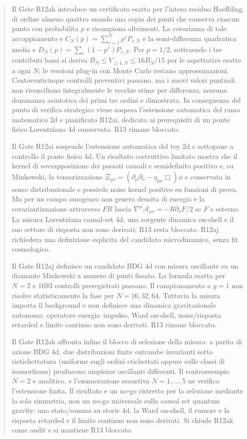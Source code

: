 \documentclass[11pt,a4paper]{article}
\begin{document}
\begin{abstract}
Il Gate R12ah introduce un certificato esatto per l'intero residuo Hoeffding di ordine almeno quattro usando una copia dei punti che conserva ciascun punto con probabilita $p$ e risampiona altrimenti. La covarianza di tale accoppiamento e $C_N(p)=\sum_{r=1}^{N} p^r P_{r,N}$ e la semi-differenza quadratica media e $D_N(p)=\sum_r(1-p^r)P_{r,N}$. Per $p=1/2$, sottraendo i tre contributi bassi si deriva $B_N\le V_{\ge4,N}\le16B_N/15$ per le aspettative esatte a ogni $N$; le versioni plug-in con Monte Carlo restano approssimazioni. Centoventicinque controlli preventivi passano, ma i nuovi valori puntuali non riconciliano integralmente le vecchie stime per differenza; nessuna dominanza asintotica dei primi tre ordini e dimostrata. In conseguenza del punto di verifica strategico viene sospesa l'estensione automatica del ramo matematico 2d e pianificato R12ai, dedicato ai prerequisiti di un ponte fisico Lorentziano 4d conservato. R13 rimane bloccato.


Il Gate R12ai sospende l'estensione automatica del toy 2d e sottopone a controllo il ponte fisico 4d. Un risultato costruttivo limitato mostra che il kernel di sovrapposizione dei passati causali e semidefinito positivo e, su Minkowski, la tensorizzazione $\Xi_{\mu\nu}=(\partial_\mu\partial_\nu-\eta_{\mu\nu}\Box)\phi$ e conservata in senso distribuzionale e possiede noise kernel positivo su funzioni di prova. Ma per un campo omogeneo non genera densita di energia e la covariantizzazione attraverso $F R$ lascia $\nabla^\mu\mathcal A_{\mu\nu}=-R\partial_\nu F/2$ se $F$ e esterno. La misura Lorentziana causal-set 4d, una sorgente dinamica on-shell e il suo settore di risposta non sono derivati; R13 resta bloccato. R12aj richiedera una definizione esplicita del candidato microdinamico, senza fit cosmologico.


Il Gate R12aj definisce un candidato BDG 4d con misura oscillante su un diamante Minkowski a numero di punti fissato. La formula esatta per $N=2$ e 1693 controlli preregistrati passano. Il campionamento a $g=1$ non risolve statisticamente la fase per $N=16,32,64$. Tuttavia la misura importa il background e non definisce una dinamica gravitazionale autonoma: operatore energia--impulso, Ward on-shell, noise/risposta retarded e limite continuo non sono derivati. R13 rimane bloccato.

Il Gate R12ak affronta infine il blocco di selezione della misura: a parita di azione BDG 4d, due distribuzioni finite entrambe invarianti sotto rietichettatura (uniforme sugli ordini etichettati oppure sulle classi di isomorfismo) producono ampiezze oscillanti differenti. Il controesempio $N=2$ e analitico, e l'enumerazione esaustiva $N=1,\ldots,5$ ne verifica l'estensione finita. Il risultato e un no-go ristretto per la selezione mediante la sola simmetria, non un no-go universale sulla causal set quantum gravity: uno stato/somma su storie 4d, la Ward on-shell, il rumore e la risposta retarded e il limite continuo non sono derivati. Si chiude R12ak come audit e si mantiene R13 bloccato.


\end{abstract}
\end{document}
